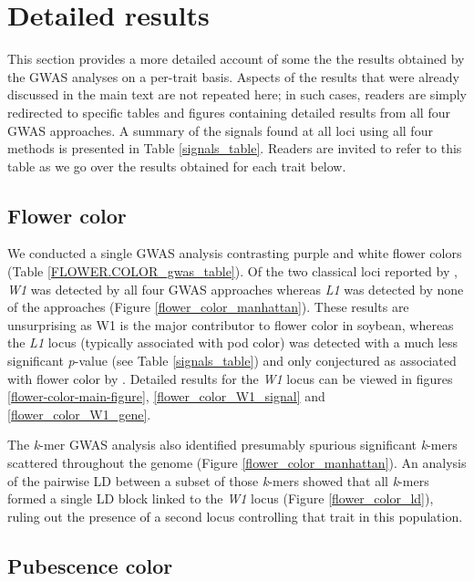 \section*{Detailed results}
\label{annexe-sv-gwas-detailed-results}

This section provides a more detailed account of some the the results obtained
by the GWAS analyses on a per-trait basis. Aspects of the results that were
already discussed in the main text are not repeated here; in such cases,
readers are simply redirected to specific tables and figures containing
detailed results from all four GWAS approaches. A summary of the signals found
at all loci using all four methods is presented in Table \ref{signals_table}.
Readers are invited to refer to this table as we go over the results obtained
for each trait below.

\subsection*{Flower color}
\label{sv-gwas-flower-color}

We conducted a single GWAS analysis contrasting purple and white flower colors
(Table \ref{FLOWER.COLOR_gwas_table}). Of the two classical loci reported by
\cite{bandillo2017}, \textit{W1} was detected by all four GWAS approaches whereas
\textit{L1} was detected by none of the approaches (Figure
\ref{flower_color_manhattan}). These results are unsurprising as W1 is the
major contributor to flower color in soybean, whereas the \textit{L1} locus
(typically associated with pod color) was detected with a much less significant
\textit{p}-value (see Table \ref{signals_table}) and only conjectured as
associated with flower color by \cite{bandillo2017}. Detailed results for the
\textit{W1} locus can be viewed in figures \ref{flower-color-main-figure},
\ref{flower_color_W1_signal} and \ref{flower_color_W1_gene}.

The \textit{k}-mer GWAS analysis also identified presumably spurious significant
\textit{k}-mers scattered throughout the genome (Figure
\ref{flower_color_manhattan}). An analysis of the pairwise LD between a subset
of those \textit{k}-mers showed that all \textit{k}-mers formed a single LD block
linked to the \textit{W1} locus (Figure \ref{flower_color_ld}), ruling out the
presence of a second locus controlling that trait in this population.

\subsection*{Pubescence color}
\label{sv-gwas-pubescence-color}

